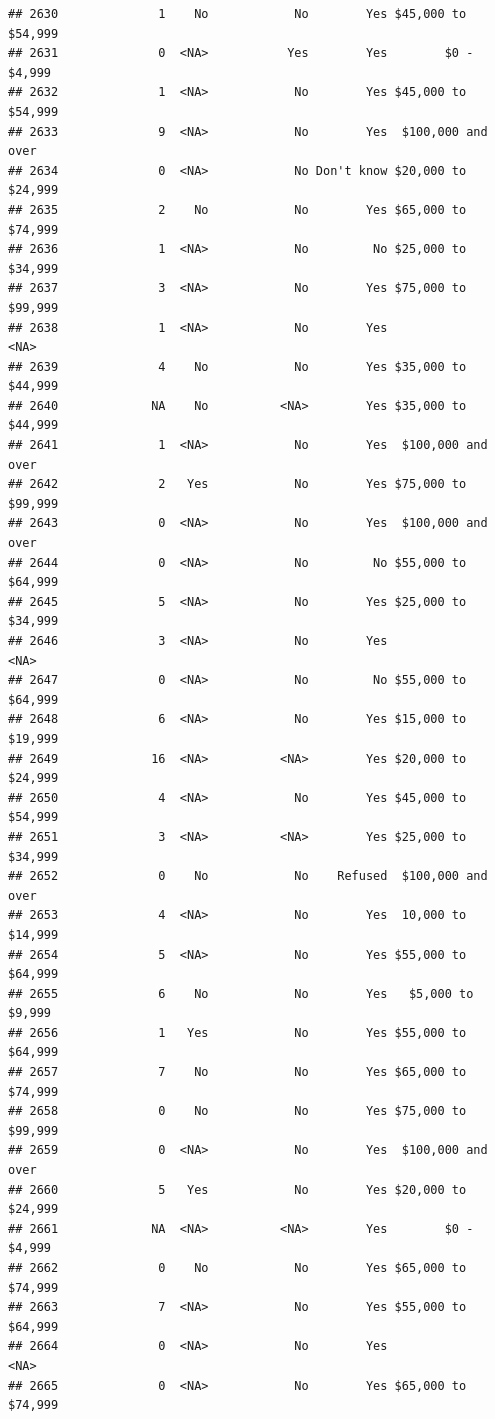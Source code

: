 \documentclass[man]{apa6}
\begin{document}
\begin{verbatim}
## 2630              1    No            No        Yes $45,000 to $54,999
## 2631              0  <NA>           Yes        Yes        $0 - $4,999
## 2632              1  <NA>            No        Yes $45,000 to $54,999
## 2633              9  <NA>            No        Yes  $100,000 and over
## 2634              0  <NA>            No Don't know $20,000 to $24,999
## 2635              2    No            No        Yes $65,000 to $74,999
## 2636              1  <NA>            No         No $25,000 to $34,999
## 2637              3  <NA>            No        Yes $75,000 to $99,999
## 2638              1  <NA>            No        Yes               <NA>
## 2639              4    No            No        Yes $35,000 to $44,999
## 2640             NA    No          <NA>        Yes $35,000 to $44,999
## 2641              1  <NA>            No        Yes  $100,000 and over
## 2642              2   Yes            No        Yes $75,000 to $99,999
## 2643              0  <NA>            No        Yes  $100,000 and over
## 2644              0  <NA>            No         No $55,000 to $64,999
## 2645              5  <NA>            No        Yes $25,000 to $34,999
## 2646              3  <NA>            No        Yes               <NA>
## 2647              0  <NA>            No         No $55,000 to $64,999
## 2648              6  <NA>            No        Yes $15,000 to $19,999
## 2649             16  <NA>          <NA>        Yes $20,000 to $24,999
## 2650              4  <NA>            No        Yes $45,000 to $54,999
## 2651              3  <NA>          <NA>        Yes $25,000 to $34,999
## 2652              0    No            No    Refused  $100,000 and over
## 2653              4  <NA>            No        Yes  10,000 to $14,999
## 2654              5  <NA>            No        Yes $55,000 to $64,999
## 2655              6    No            No        Yes   $5,000 to $9,999
## 2656              1   Yes            No        Yes $55,000 to $64,999
## 2657              7    No            No        Yes $65,000 to $74,999
## 2658              0    No            No        Yes $75,000 to $99,999
## 2659              0  <NA>            No        Yes  $100,000 and over
## 2660              5   Yes            No        Yes $20,000 to $24,999
## 2661             NA  <NA>          <NA>        Yes        $0 - $4,999
## 2662              0    No            No        Yes $65,000 to $74,999
## 2663              7  <NA>            No        Yes $55,000 to $64,999
## 2664              0  <NA>            No        Yes               <NA>
## 2665              0  <NA>            No        Yes $65,000 to $74,999

\end{verbatim}
\end{document}
